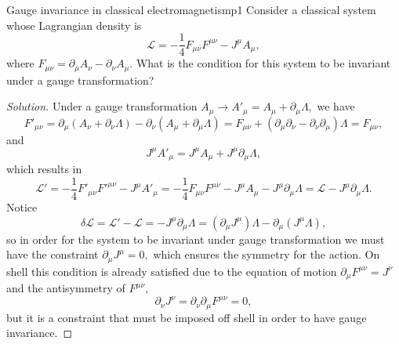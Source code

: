 \begin{problem}{Gauge invariance in classical electromagnetism}{p1}
   Consider a classical system whose Lagrangian density is 
   \begin{equation*}
      \mathcal{L} = - \frac14 F_{\mu \nu}F^{\mu\nu} - J^\mu A_\mu,
   \end{equation*}
   where \(F_{\mu \nu} = \partial_\mu A_\nu - \partial_\nu A_\mu.\) What is the condition for this system to be invariant under a gauge transformation?
\end{problem}
\begin{proof}[Solution]
   Under a gauge transformation \(A_\mu \to A'_\mu = A_\mu + \partial_\mu \Lambda,\) we have
   \begin{equation*}
      F'_{\mu\nu} = \partial_\mu\left(A_\nu + \partial_\nu \Lambda\right) - \partial_\nu \left(A_\mu + \partial_\mu \Lambda\right) = F_{\mu\nu} + \left(\partial_\mu \partial_\nu - \partial_\nu \partial_\mu\right)\Lambda = F_{\mu\nu},
   \end{equation*}
   and
   \begin{equation*}
      J^\mu A'_{\mu} = J^\mu A_\mu + J^\mu \partial_\mu \Lambda,
   \end{equation*}
   which results in
   \begin{equation*}
      \mathcal{L}' = - \frac14 F'_{\mu\nu} F'^{\mu\nu} - J^\mu A'_\mu = - \frac14 F_{\mu\nu} F^{\mu\nu} - J^\mu A_\mu - J^\mu \partial_\mu \Lambda = \mathcal{L} - J^\mu \partial_\mu \Lambda.
   \end{equation*}
   Notice
   \begin{equation*}
      \delta \mathcal{L} = \mathcal{L}' - \mathcal{L} = -J^\mu \partial_\mu \Lambda = (\partial_\mu J^\mu)\Lambda - \partial_\mu\left(J^\mu \Lambda\right),
   \end{equation*}
   so in order for the system to be invariant under gauge transformation we must have the constraint \(\partial_\mu J^\mu = 0,\) which ensures the symmetry for the action. On shell this condition is already satisfied due to the equation of motion \(\partial_\mu F^{\mu\nu} = J^\nu\) and the antisymmetry of \(F^{\mu\nu},\)
   \begin{equation*}
      \partial_\nu J^\nu = \partial_\nu \partial_\mu F^{\mu\nu} = 0,
   \end{equation*}
   but it is a constraint that must be imposed off shell in order to have gauge invariance.
\end{proof}
